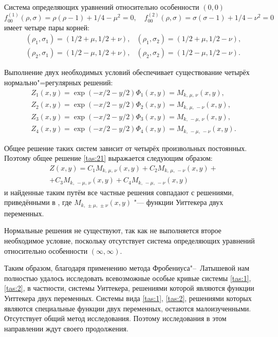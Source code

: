 Система определяющих уравнений относительно особенности $(0, 0)$
$$
f_{00}^{(1)}(\rho,\sigma)=\rho(\rho-1)+{1}/{4}-\mu^{2}=0, \quad 
f_{00}^{(2)}(\rho,\sigma)=\sigma(\sigma-1) + {1}/{4}-\nu^{2}=0
$$
имеет четыре пары корней:
$$
\begin{array}{ll}
(\rho_{1},\sigma_{1})=({1}/{2}+\mu, {1}/{2}+\nu), &
(\rho_{1},\sigma_{2})=({1}/{2}+\mu, {1}/{2}-\nu), \\
(\rho_{2},\sigma_{1})=({1}/{2}-\mu, {1}/{2}+\nu), &
(\rho_{2},\sigma_{2})=({1}/{2}-\mu, {1}/{2}-\nu).
\end{array}
$$

Выполнение двух необходимых условий обеспечивает существование
четырёх нормально"=регулярных решений:
$$
\begin{array}{l}
Z_{1}(x,y)=\exp(-{x}/{2}-{y}/{2})  
\Phi_{1}(x,y)=M_{k,\,\mu,\,\nu}(x,y), \\
Z_{2}(x,y)=\exp(-{x}/{2}-{y}/{2})  
\Phi_{2}(x,y)=M_{k,\, \mu,\, -\nu}(x,y),\\
Z_{3}(x,y)=\exp(-{x}/{2}-{y}/{2})  
\Phi_{3}(x,y)=M_{k,\, -\mu,\, \nu}(x,y),\\
Z_{4}(x,y)=\exp(-{x}/{2}-{y}/{2})   \Phi_{4}(x,y)=M_{k,\, -\mu,\, -\nu}(x,y).
\end{array}
$$

Общее решение таких систем зависит \cite{tas:bib:5} от четырёх произвольных
постоянных. Поэтому общее решение \eqref{tas:21} выражается  следующим
образом:
\begin{multline*}
Z(x,y)=C_{1}   M_{k,\,\mu,\,\nu}(x,y)+C_{2}  
M_{k,\,\mu,\,-\nu}(x,y)+ \\ +C_{3}  
M_{k,\,-\mu,\,\nu}(x,y)
+C_{4}   M_{k,\,-\mu,\,-\nu}(x,y)
\end{multline*}
и найденные таким путём все частные решения совпадают с решениями, приведёнными в \cite{tas:bib:5}, где $M_{k,\,\pm\mu,\,\pm\nu}(x,y)$ "--- функции Уиттекера двух переменных.

Нормальные решения не существуют, так как не выполняется второе
необходимое условие, поскольку отсутствует система определяющих
уравнений относительно особенности $(\infty, \infty)$.

Таким образом, благодаря применению метода Фробениуса"--~Латышевой нам полностью
удалось исследовать всевозможные особые кривые системы \eqref{tas:1}, \eqref{tas:2}, в
частности, системы Уиттекера, решениями которой являются функции
Уиттекера двух переменных. Системы вида \eqref{tas:1}, \eqref{tas:2}, решениями которых
являются специальные функции двух переменных, остаются
малоизученными. Отсутствует общий метод исследования. Поэтому
исследования в этом направлении ждут своего продолжения.




